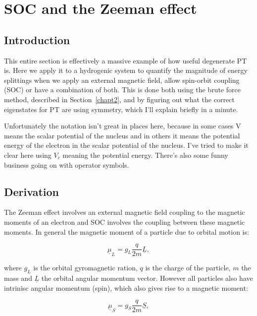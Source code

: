 \chapter{SOC and the Zeeman effect}
\label{chapt4}

\section{Introduction}

This entire section is effectively a massive example of how useful degenerate PT is. Here we apply it to a hydrogenic system to quantify the magnitude of energy splittings when we apply an external magnetic field, allow spin-orbit coupling (SOC) or have a combination of both. This is done both using the brute force method, described in Section~\ref{chapt2}, and by figuring out what the correct eigenstates for PT are using symmetry, which I'll explain briefly in a minute.

\noindent Unfortunately the notation isn't great in places here, because in some cases V means the scalar potential of the nucleus and in others it means the potential energy of the electron in the scalar potential of the nucleus. I've tried to make it clear here using $V_c$ meaning the potential energy. There's also some funny business going on with operator symbols.

\section{Derivation}

The Zeeman effect involves an external magnetic field coupling to the magnetic moments of an electron and SOC involves the coupling between these magnetic moments. In general the magnetic moment of a particle due to orbital motion is:

\begin{equation}
    \underline{\mu}_L = g_L \frac{q}{2m} \underline{L},
    \label{OrbitalMagneticMoment}
\end{equation}

\noindent where $g_L$ is the orbital gyromagnetic ration, $q$ is the charge of the particle, $m$ the mass and $\underline{L}$ the orbital angular momentum vector. However all particles also have intrinisc angular momentum (spin), which also gives rise to a magnetic moment:

\begin{equation}
    \underline{\mu}_S = g_S \frac{q}{2m} \underline{S},
    \label{SpinMagneticMoment}
\end{equation}

